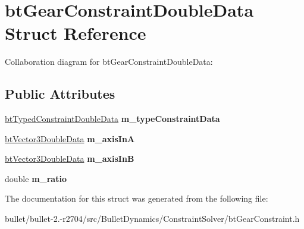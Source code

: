 \hypertarget{structbt_gear_constraint_double_data}{\section{bt\+Gear\+Constraint\+Double\+Data Struct Reference}
\label{structbt_gear_constraint_double_data}
}


Collaboration diagram for bt\+Gear\+Constraint\+Double\+Data\+:
\subsection*{Public Attributes}
\begin{DoxyCompactItemize}
\item 
\hypertarget{structbt_gear_constraint_double_data_a853abf6706c1bd322df0eb90d92ccc81}{\hyperlink{structbt_typed_constraint_double_data}{bt\+Typed\+Constraint\+Double\+Data} {\bfseries m\+\_\+type\+Constraint\+Data}}\label{structbt_gear_constraint_double_data_a853abf6706c1bd322df0eb90d92ccc81}

\item 
\hypertarget{structbt_gear_constraint_double_data_a6acca0dbc977abf767db86c817ae35f3}{\hyperlink{structbt_vector3_double_data}{bt\+Vector3\+Double\+Data} {\bfseries m\+\_\+axis\+In\+A}}\label{structbt_gear_constraint_double_data_a6acca0dbc977abf767db86c817ae35f3}

\item 
\hypertarget{structbt_gear_constraint_double_data_af833dc67a6b05f00014bb42d2b02099f}{\hyperlink{structbt_vector3_double_data}{bt\+Vector3\+Double\+Data} {\bfseries m\+\_\+axis\+In\+B}}\label{structbt_gear_constraint_double_data_af833dc67a6b05f00014bb42d2b02099f}

\item 
\hypertarget{structbt_gear_constraint_double_data_a090eaf866589dd6e9e960ce6b6b6ba13}{double {\bfseries m\+\_\+ratio}}\label{structbt_gear_constraint_double_data_a090eaf866589dd6e9e960ce6b6b6ba13}

\end{DoxyCompactItemize}


The documentation for this struct was generated from the following file\+:\begin{DoxyCompactItemize}
\item 
bullet/bullet-\/2.-\/r2704/src/\+Bullet\+Dynamics/\+Constraint\+Solver/bt\+Gear\+Constraint.\+h\end{DoxyCompactItemize}
